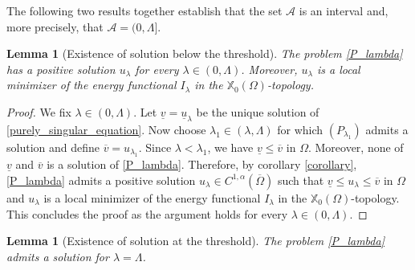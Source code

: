 \documentclass[reqno,oneside]{amsart}
\newtheorem{lemma}[theorem]{Lemma}
\theoremstyle{definition}
\theoremstyle{remark}
\numberwithin{equation}{section}
\newcommand{\Om} {\Omega}
\newcommand{\coa}{C^{1,\alpha}(\overline{\Om})}
\newcommand{\xo}{\mathbb{X}_0}
\newcommand{\la} {\lambda}
\begin{document}
The following two results together establish that the set $\mathcal{A}$ is an interval and, more precisely, that $\mathcal{A}= (0, \Lambda]$.

\begin{lemma}[Existence of solution below the threshold]\label{multiplicity_local minimizer}
    The problem \eqref{P_lambda} has a positive solution $u_{\la}$ for every $\la\in (0, \Lambda)$. Moreover, $u_{\la}$ is a local minimizer of the energy functional $I_{\la}$ in the $\xo (\Om)$-topology.
\end{lemma}

\begin{proof}
    We fix $\la \in (0,\Lambda)$. Let $\underline{v}=\underline{u}_{\la}$ be the unique solution of \eqref{purely_singular_equation}. Now choose $\la_1 \in (\la, \Lambda)$ for which $(P_{\la_1})$ admits a solution and define $\overline{v} = u_{\la_1}$. Since $\la < \la_1$, we have $\underline{v} \leq \overline{v}$ in $\Om$. Moreover, none of $\underline{v}$ and $\overline{v}$ is a solution of \eqref{P_lambda}. Therefore, by corollary \ref{corollary}, \eqref{P_lambda} admits a positive solution $u_{\la} \in \coa$ such that $\underline{v} \leq u_{\la} \leq \overline{v}$ in $\Om$ and $u_{\la}$ is a local minimizer of the energy functional $I_{\la}$ in the $\xo (\Om)$-topology. This concludes the proof as the argument holds for every $\la \in (0, \Lambda)$.
\end{proof}

\begin{lemma}[Existence of solution at the threshold]\label{solution_limiting case}
    The problem \eqref{P_lambda} admits a solution for $\la = \Lambda$.
\end{lemma}
\end{document}
